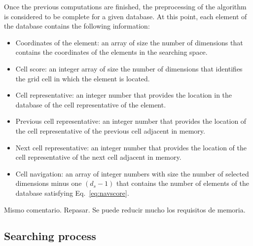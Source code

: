 \documentclass[preprint,12pt]{elsarticle}
\begin{document}
Once the previous computations are finished, the preprocessing of the algorithm is considered to be complete for a given database. At this point, each element of the database contains the following information:
\begin{itemize}
	\item Coordinates of the element: an array of size the number of dimensions that contains the coordinates of the elements in the searching space.
	\item Cell score: an integer array of size the number of dimensions that identifies the grid cell in which the element is located.
	\item Cell representative: an integer number that provides the location in the database of the cell representative of the element. 
	\item Previous cell representative: an integer number that provides the location of the cell representative of the previous cell adjacent in memory.
	\item Next cell representative: an integer number that provides the location of the cell representative of the next cell adjacent in memory.
	\item Cell navigation: an array of integer numbers with size the number of selected dimensions minus one $(d_s - 1)$ that contains the number of elements of the database satisfying Eq.~\eqref{eq:navscore}.
\end{itemize} 
\color{red} Mismo comentario. Repasar. Se puede reducir mucho los requisitos de memoria. \color{black}


\subsection{Searching process}
\label{sec:search}
\end{document}

